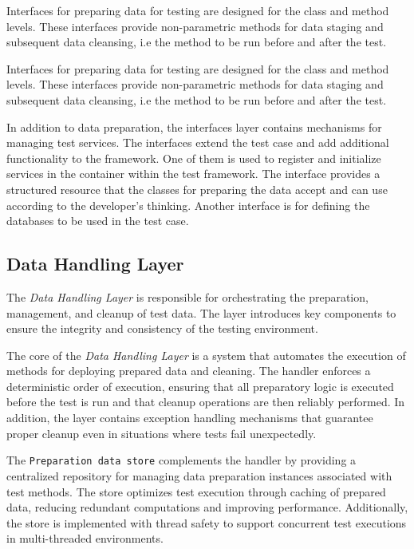 Interfaces for preparing data for testing are designed for the class and method levels. These interfaces provide non-parametric methods for data staging and subsequent data cleansing, i.e the method to be run before and after the test.

Interfaces for preparing data for testing are designed for the class and method levels. These interfaces provide non-parametric methods for data staging and subsequent data cleansing, i.e the method to be run before and after the test.

In addition to data preparation, the interfaces layer contains mechanisms for managing test services. The interfaces extend the test case and add additional functionality to the framework.   One of them is used to register and initialize services in the container within the test framework. 
The interface provides a structured resource that the classes for preparing the data accept and can use according to the developer's thinking.
Another interface is for defining the databases to be used in the test case. 



\subsection{Data Handling Layer}


The \textit{Data Handling Layer} is responsible for orchestrating the preparation, management, and cleanup of test data. The layer introduces key components to ensure the integrity and consistency of the testing environment.

The core of the \textit{Data Handling Layer} is a system that automates the execution of methods for deploying prepared data and cleaning. The handler enforces a deterministic order of execution, ensuring that all preparatory logic is executed before the test is run and that cleanup operations are then reliably performed. In addition, the layer contains exception handling mechanisms that guarantee proper cleanup even in situations where tests fail unexpectedly.

The \texttt{Preparation data store} complements the handler by providing a centralized repository for managing data preparation instances associated with test methods. The store optimizes test execution through caching of prepared data, reducing redundant computations and improving performance. Additionally, the store is implemented with thread safety to support concurrent test executions in multi-threaded environments.

